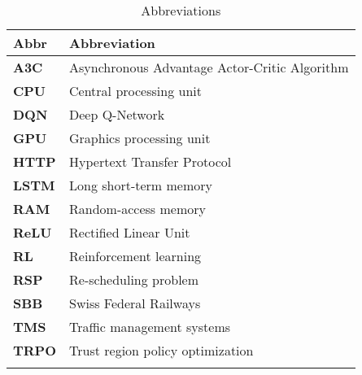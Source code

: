 \begin{longtable}{|m{3cm}|m{11cm}|}\hline	
	\rowcolor{gray} \textbf{Abbr}&
	Abbreviation \\ \hline

	\textbf{A3C}&
	Asynchronous Advantage Actor-Critic Algorithm \\ \hline
	
	\textbf{CPU}&
	Central processing unit \\ 
	\hline

	\textbf{DQN}&
	Deep Q-Network \\ 
	\hline
	
	\textbf{GPU}&
	Graphics processing unit \\ 
	\hline

	\textbf{HTTP}&
	Hypertext Transfer Protocol \\ 
	\hline

	\textbf{LSTM}&
	Long short-term memory \\ 
	\hline

	\textbf{RAM}&
	Random-access memory \\
	\hline

	\textbf{ReLU}&
	Rectified Linear Unit \\
	\hline

	\textbf{RL}&
	Reinforcement learning \\ 
	\hline

	\textbf{RSP}&
	Re-scheduling problem \\ 
	\hline

	\textbf{SBB}&
	Swiss Federal Railways \\
	\hline

	\textbf{TMS}&
	Traffic management systems \\ 
	\hline

	\textbf{TRPO}&
	Trust region policy optimization \\ 
	\hline

\caption{Abbreviations}
\label{tab:abkuerzungsverzeichnis}
\end{longtable}
